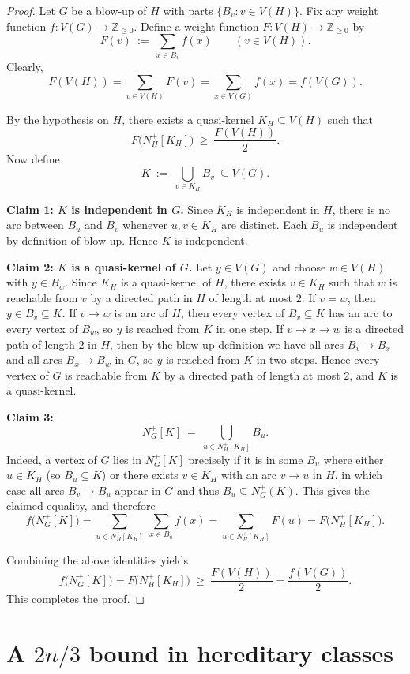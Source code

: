 \documentclass[11pt,a4paper]{article}
\begin{document}
\begin{proof}
Let $G$ be a blow-up of $H$ with parts $\{B_v: v\in V(H)\}$.
Fix any weight function $f:V(G)\to \mathbb{Z}_{\ge0}$.
Define a weight function $F:V(H)\to \mathbb{Z}_{\ge0}$ by
\[
F(v)\ :=\ \sum_{x\in B_v} f(x)\qquad (v\in V(H)).
\]
Clearly,
\[
F(V(H))=\sum_{v\in V(H)}F(v)=\sum_{x\in V(G)}f(x)=f(V(G)).
\]

By the hypothesis on $H$, there exists a quasi-kernel $K_H\subseteq V(H)$ such that
\[
F\big(N_H^{+}[K_H]\big)\ \ge\ \frac{F(V(H))}{2}.
\]
Now define
\[
K \ :=\ \bigcup_{v\in K_H} B_v \ \subseteq V(G).
\]

\smallskip
\noindent\textbf{Claim 1: $K$ is independent in $G$.}
Since \(K_H\) is independent in \(H\), there is no arc between \(B_u\) and \(B_v\) whenever \(u,v\in K_H\) are distinct. Each \(B_u\) is independent by definition of blow-up. Hence \(K\) is independent.

\smallskip
\noindent\textbf{Claim 2: $K$ is a quasi-kernel of $G$.}
Let $y\in V(G)$ and choose $w\in V(H)$ with $y\in B_w$.
Since $K_H$ is a quasi-kernel of $H$, there exists $v\in K_H$ such that $w$ is reachable from $v$
by a directed path in $H$ of length at most $2$.
If $v=w$, then $y\in B_v\subseteq K$.
If $v\to w$ is an arc of $H$, then every vertex of $B_v\subseteq K$ has an arc to every vertex of $B_w$,
so $y$ is reached from $K$ in one step.
If $v\to x\to w$ is a directed path of length $2$ in $H$, then by the blow-up definition we have
all arcs $B_v\to B_x$ and all arcs $B_x\to B_w$ in $G$, so $y$ is reached from $K$ in two steps.
Hence every vertex of $G$ is reachable from $K$ by a directed path of length at most $2$, and $K$ is a quasi-kernel.

\smallskip
\noindent\textbf{Claim 3:
\[
N_G^{+}[K]\ =\ \bigcup_{u\in N_H^{+}[K_H]} B_u.
\]}
Indeed, a vertex of $G$ lies in $N_G^{+}[K]$ precisely if it is in some $B_u$ where either
$u\in K_H$ (so $B_u\subseteq K$) or there exists $v\in K_H$ with an arc $v\to u$ in $H$,
in which case all arcs $B_v\to B_u$ appear in $G$ and thus $B_u\subseteq N_G^{+}(K)$.
This gives the claimed equality, and therefore
\[
f\big(N_G^{+}[K]\big)
=\sum_{u\in N_H^{+}[K_H]}\ \sum_{x\in B_u} f(x)
=\sum_{u\in N_H^{+}[K_H]} F(u)
=F\big(N_H^{+}[K_H]\big).
\]

Combining the above identities yields
\[
f\big(N_G^{+}[K]\big)
=F\big(N_H^{+}[K_H]\big)
\ \ge\ \frac{F(V(H))}{2}
=\frac{f(V(G))}{2}.
\]
This completes the proof.
\end{proof}

\section{A \texorpdfstring{$2n/3$}{2n/3} bound in hereditary classes}
\end{document}
